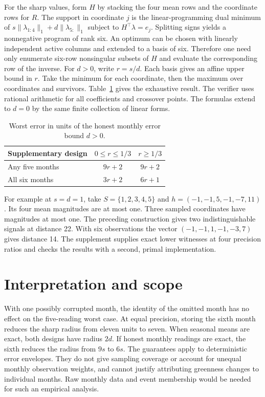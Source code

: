 \documentclass[11pt]{article}
\begin{document}
For the sharp values, form $H$ by stacking the four mean rows and the coordinate rows for $R$. The support in coordinate $j$ is the linear-programming dual minimum of $s\|\lambda_{1:4}\|_1+d\|\lambda_{5:}\|_1$ subject to $H^\top\lambda=e_j$. Splitting signs yields a nonnegative program of rank six. An optimum can be chosen with linearly independent active columns and extended to a basis of six. Therefore one need only enumerate six-row nonsingular subsets of $H$ and evaluate the corresponding row of the inverse. For $d>0$, write $r=s/d$. Each basis gives an affine upper bound in $r$. Take the minimum for each coordinate, then the maximum over coordinates and survivors. Table~\ref{tab:bounds} gives the exhaustive result. The verifier uses rational arithmetic for all coefficients and crossover points. The formulas extend to $d=0$ by the same finite collection of linear forms.
\begin{table}[h]\centering
\begin{tabular}{lcc}\toprule
Supplementary design & $0\le r\le 1/3$ & $r\ge1/3$\\\midrule
Any five months & $9r+2$ & $9r+2$\\
All six months & $3r+2$ & $6r+1$\\\bottomrule
\end{tabular}\caption{Worst error in units of the honest monthly error bound $d>0$.}\label{tab:bounds}
\end{table}

For example at $s=d=1$, take $S=\{1,2,3,4,5\}$ and $h=(-1,-1,5,-1,-7,11)$. Its four mean magnitudes are at most one. Three sampled coordinates have magnitudes at most one. The preceding construction gives two indistinguishable signals at distance 22. With six observations the vector $(-1,-1,1,-1,-3,7)$ gives distance 14. The supplement supplies exact lower witnesses at four precision ratios and checks the results with a second, primal implementation.

\section{Interpretation and scope}
With one possibly corrupted month, the identity of the omitted month has no effect on the five-reading worst case. At equal precision, storing the sixth month reduces the sharp radius from eleven units to seven. When seasonal means are exact, both designs have radius $2d$. If honest monthly readings are exact, the sixth reduces the radius from $9s$ to $6s$. The guarantees apply to deterministic error envelopes. They do not give sampling coverage or account for unequal monthly observation weights, and cannot justify attributing greenness changes to individual months. Raw monthly data and event membership would be needed for such an empirical analysis.
\end{document}
